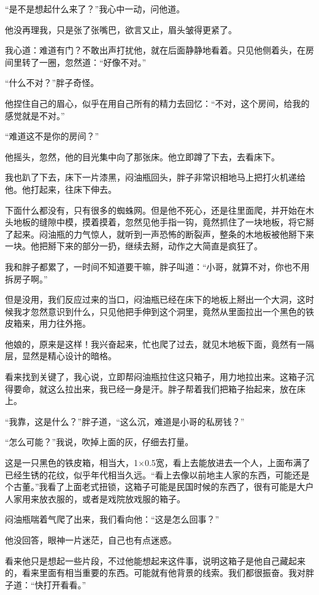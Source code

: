 “是不是想起什么来了？”我心中一动，问他道。

他没再理我，只是张了张嘴巴，欲言又止，眉头皱得更紧了。

我心道：难道有门？不敢出声打扰他，就在后面静静地看着。只见他侧着头，在房间里转了一圈，忽然道：“好像不对。”

“什么不对？”胖子奇怪。

他捏住自己的眉心，似乎在用自己所有的精力去回忆：“不对，这个房间，给我的感觉就是不对。”

“难道这不是你的房间？”

他摇头，忽然，他的目光集中向了那张床。他立即蹲了下去，去看床下。

我也趴了下去，床下一片漆黑，闷油瓶回头，胖子非常识相地马上把打火机递给他。他打起来，往床下伸去。

下面什么都没有，只有很多的蜘蛛网。但是他不死心，还是往里面爬，并开始在木头地板的缝隙中模，摸着摸着，忽然见他手指一钩，竟然抓住了一块地板，将它掰了起来。闷油瓶的力气惊人，就听到一声恐怖的断裂声，整条的木地板被他掰下来一块。他把掰下来的部分一扔，继续去掰，动作之大简直是疯狂了。

我和胖子都累了，一时间不知道要干嘛，胖子叫道：“小哥，就算不对，你也不用拆房子啊。”

但是没用，我们反应过来的当口，闷油瓶已经在床下的地板上掰出一个大洞，这时候我才忽然意识到什么，只见他把手伸到这个洞里，竟然从里面拉出一个黑色的铁皮箱来，用力往外拖。

他娘的，原来是这样！我兴奋起来，忙也爬了过去，就见木地板下面，竟然有一隔层，显然是精心设计的暗格。

看来找到关键了，我心说，立即帮闷油瓶拉住这只箱子，用力地拉出来。这箱子沉得要命，就这么拉出来，我已经一身是汗。胖子帮着我们把箱子抬起来，放在床上。

“我靠，这是什么？”胖子道，“这么沉，难道是小哥的私房钱？”

“怎么可能？”我说，吹掉上面的灰，仔细去打量。

这是一只黑色的铁皮箱，相当大，1×0.5宽，看上去能放进去一个人，上面布满了已经生锈的花纹，似乎年代相当久远。“看上去像以前地主人家的东西，可能还是个古董。”我看了上面老式扭锁，这箱子可能是民国时候的东西了，很有可能是大户人家用来放衣服的，或者是戏院放戏服的箱子。

闷油瓶喘着气爬了出来，我们看向他：“这是怎么回事？”

他没回答，眼神一片迷茫，自己也有点迷惑。

看来他只是想起一些片段，不过他能想起来这件事，说明这箱子是他自己藏起来的，看来里面有相当重要的东西。可能就有他背景的线索。我们都很振奋。我对胖子道：“快打开看看。”

